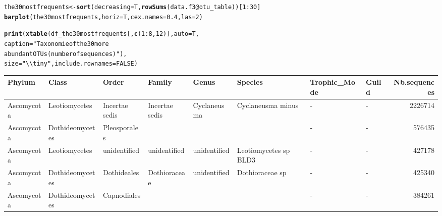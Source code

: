 \documentclass[12pt]{article}\usepackage[]{graphicx}\usepackage[]{color}
\makeatletter
\newcommand{\hlnum}[1]{\textcolor[rgb]{0.686,0.059,0.569}{#1}}%
\newcommand{\hlstr}[1]{\textcolor[rgb]{0.192,0.494,0.8}{#1}}%
\newcommand{\hlopt}[1]{\textcolor[rgb]{0,0,0}{#1}}%
\newcommand{\hlstd}[1]{\textcolor[rgb]{0.345,0.345,0.345}{#1}}%
\newcommand{\hlkwb}[1]{\textcolor[rgb]{0.69,0.353,0.396}{#1}}%
\newcommand{\hlkwc}[1]{\textcolor[rgb]{0.333,0.667,0.333}{#1}}%
\newcommand{\hlkwd}[1]{\textcolor[rgb]{0.737,0.353,0.396}{\textbf{#1}}}%
\newenvironment{kframe}{%
 \def\at@end@of@kframe{}%
 \ifinner\ifhmode%
  \def\at@end@of@kframe{\end{minipage}}%
  \begin{minipage}{\columnwidth}%
 \fi\fi%
 \def\FrameCommand##1{\hskip\@totalleftmargin \hskip-\fboxsep
 \colorbox{shadecolor}{##1}\hskip-\fboxsep
     \hskip-\linewidth \hskip-\@totalleftmargin \hskip\columnwidth}%
 \MakeFramed {\advance\hsize-\width
   \@totalleftmargin\z@ \linewidth\hsize
   \@setminipage}}%
 {\par\unskip\endMakeFramed%
 \at@end@of@kframe}
\newenvironment{knitrout}{}{} %
\numberwithin{figure}{section}
\makeatother
\begin{document}
\begin{knitrout}\small
{}\color{fgcolor}\begin{kframe}
\begin{alltt}
\hlstd{the30mostfrequents} \hlkwb{<-} \hlkwd{sort}\hlstd{(}\hlkwc{decreasing} \hlstd{= T,} \hlkwd{rowSums}\hlstd{(data.f3}\hlopt{@}\hlkwc{otu_table}\hlstd{))[}\hlnum{1}\hlopt{:}\hlnum{30}\hlstd{]}
\hlkwd{barplot}\hlstd{(the30mostfrequents,} \hlkwc{horiz} \hlstd{= T,} \hlkwc{cex.names} \hlstd{=} \hlnum{0.4}\hlstd{,} \hlkwc{las} \hlstd{=} \hlnum{2}\hlstd{)}
\end{alltt}
\end{kframe}
\end{knitrout}



\begin{landscape}
\begin{kframe}
\begin{alltt}
\hlkwd{print}\hlstd{(}\hlkwd{xtable}\hlstd{(df_the30mostfrequents[,} \hlkwd{c}\hlstd{(}\hlnum{1}\hlopt{:}\hlnum{8}\hlstd{,} \hlnum{12}\hlstd{)],} \hlkwc{auto} \hlstd{= T,}
             \hlkwc{caption} \hlstd{=} \hlstr{"Taxonomie of the 30 more
             abundant OTUs (number of sequences)"}\hlstd{),}
      \hlkwc{size} \hlstd{=} \hlstr{"\textbackslash{}\textbackslash{}tiny"}\hlstd{,} \hlkwc{include.rownames} \hlstd{=} \hlnum{FALSE}\hlstd{)}
\end{alltt}
\end{kframe}%
\begin{table}[ht]
\centering
\begingroup\tiny
\begin{tabular}{llllllllr}
  \hline
Phylum & Class & Order & Family & Genus & Species & Trophic\_Mode & Guild & Nb.sequences \\ 
  \hline
Ascomycota & Leotiomycetes & Incertae sedis & Incertae sedis & Cyclaneusma & Cyclaneusma minus & - & - & 2226714 \\ 
  Ascomycota & Dothideomycetes & Pleosporales &  &  &  & - & - & 576435 \\ 
  Ascomycota & Leotiomycetes & unidentified & unidentified & unidentified & Leotiomycetes sp BLD3 & - & - & 427178 \\ 
  Ascomycota & Dothideomycetes & Dothideales & Dothioraceae & unidentified & Dothioraceae sp & - & - & 425340 \\ 
  Ascomycota & Dothideomycetes & Capnodiales &  &  &  & - & - & 384261 \\ 

\end{tabular}
\end{table}
\end{landscape}
\end{document}
